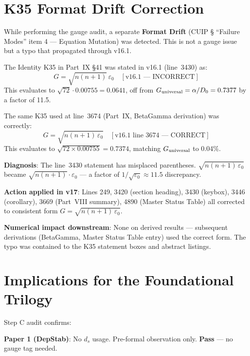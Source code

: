 \documentclass[12pt, a4paper]{article}
\begin{document}
\section{K35 Format Drift Correction}

While performing the gauge audit, a separate \textbf{Format Drift} (CUIP §
``Failure Modes'' item 4 --- Equation Mutation) was detected. This is not a
gauge issue but a typo that propagated through v16.1.

\begin{keybox}[title={K35 Statement Correction (v17)}]
The Identity K35 in Part~IX §41 was stated in v16.1 (line~3430) as:
\[
  G = \sqrt{n(n+1)}\,\varepsilon_0 \quad [\text{v16.1 — INCORRECT}]
\]
This evaluates to $\sqrt{72}\cdot 0.00755 = 0.0641$, off from
$G_{\rm universal} = \alpha/D_0 = 0.7377$ by a factor of 11.5.

The same K35 used at line~3674 (Part~IX, BetaGamma derivation) was correctly:
\[
  G = \sqrt{n(n+1)\,\varepsilon_0} \quad [\text{v16.1 line 3674 — CORRECT}]
\]
This evaluates to $\sqrt{72\times 0.00755} = 0.7374$, matching
$G_{\rm universal}$ to 0.04\%.

\textbf{Diagnosis}: The line~3430 statement has misplaced parentheses.
$\sqrt{n(n+1)\,\varepsilon_0}$ became $\sqrt{n(n+1)}\cdot\varepsilon_0$ ---
a factor of $1/\sqrt{\varepsilon_0} \approx 11.5$ discrepancy.

\textbf{Action applied in v17}: Lines 249, 3420 (section heading), 3430 (keybox),
3446 (corollary), 3669 (Part~VIII summary), 4890 (Master Status Table) all
corrected to consistent form $G = \sqrt{n(n+1)\,\varepsilon_0}$.

\textbf{Numerical impact downstream}: None on derived results --- subsequent
derivations (BetaGamma, Master Status Table entry) used the correct form.
The typo was contained to the K35 statement boxes and abstract listings.
\end{keybox}

\section{Implications for the Foundational Trilogy}

Step C audit confirms:

\textbf{Paper 1 (DepStab)}: No $d_s$ usage. Pre-formal observation only.
\textbf{Pass} --- no gauge tag needed.
\end{document}
